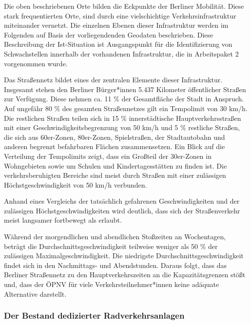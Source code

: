 Die oben beschriebenen Orte bilden die Eckpunkte der Berliner Mobilität. Diese stark frequentierten Orte, sind durch eine vielschichtige Verkehrsinfrastruktur miteinander vernetzt. Die einzelnen Ebenen dieser Infrastruktur werden im Folgenden auf Basis der vorliegendenden Geodaten beschrieben. Diese Beschreibung der Ist-Situation ist Ausgangspunkt für die Identifizierung von Schwachstellen innerhalb der vorhandenen Infrastruktur, die in Arbeitspaket 2 vorgenommen wurde.

Das Straßennetz bildet eines der zentralen Elemente dieser Infrastruktur. Insgesamt stehen den Berliner Bürger*innen 5.437 Kilometer öffentlicher Straßen zur Verfügung. Diese nehmen ca. 11 \% der Gesamtfläche der Stadt in Anspruch. Auf ungefähr 80 \% des gesamten Straßennetzes gilt ein Tempolimit von 30 km/h. Die restlichen Straßen teilen sich in 15 \% innerstädtische Hauptverkehrsstraßen mit einer Geschwindigkeitsbegrenzung von 50 km/h und 5 \% restliche Straßen, die sich aus 60er-Zonen, 80er-Zonen, Spielstraßen, der Stadtautobahn und anderen begrenzt befahrbaren Flächen zusammensetzen. Ein Blick auf die Verteilung der Tempolimits zeigt, dass ein Großteil der 30er-Zonen in Wohngebieten sowie um Schulen und Kindertagesstätten zu finden ist. Die verkehrsberuhigten Bereiche sind meist durch Straßen mit einer zulässigen Höchstgeschwindigkeit von 50 km/h verbunden.


Anhand eines Vergleichs der tatsächlich gefahrenen Geschwindigkeiten und der zulässigen Höchstgeschwindigkeiten wird deutlich, dass sich der Straßenverkehr meist langsamer fortbewegt als erlaubt.


Während der morgendlichen und abendlichen Stoßzeiten an Wochentagen, beträgt die Durchschnittsgeschwindigkeit teilweise weniger als 50 \% der zulässigen Maximalgeschwindigkeit. Die niedrigste Durchschnittsgeschwindigkeit findet sich in den Nachmittags- und Abendstunden. Daraus folgt, dass das Berliner Straßennetz zu den Hauptverkehrszeiten an die Kapazitätsgrenzen stößt und, dass der ÖPNV für viele Verkehrsteilnehmer*innen keine adäquate Alternative darstellt.

\subsubsection{Der Bestand dedizierter Radverkehrsanlagen}

